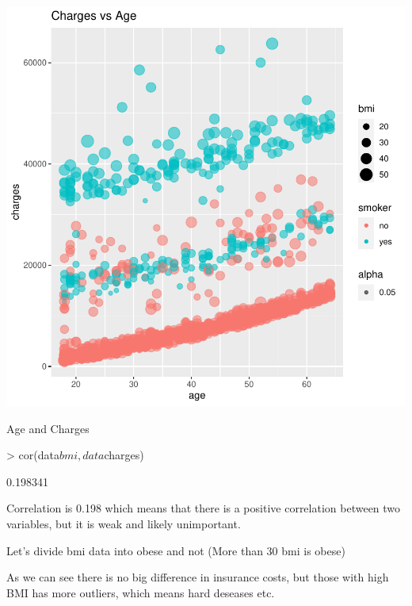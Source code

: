 \documentclass{article}
\begin{document}
\begin{centerfig}
\includegraphics{Untitled-050}
\caption{Age and Charges}
\label{fig:BestPlot}
\end{centerfig}

\begin{Schunk}
\begin{Sinput}
> cor(data$bmi,data$charges)
\end{Sinput}
\begin{Soutput}
[1] 0.198341
\end{Soutput}
\end{Schunk}

Correlation is 0.198 which means that there is a positive correlation between two variables, 
but it is weak and likely unimportant.

Let's divide bmi data into obese and not (More than 30 bmi is obese)

\begin{Schunk}
\end{Schunk}

As we can see there is no big difference in insurance costs, but 
those with high BMI has more outliers, which means hard deseases etc.
\end{document}
